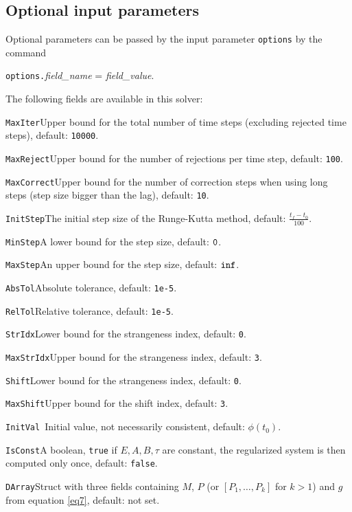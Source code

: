\documentclass[final,reqno]{siamltex}
\renewenvironment{itemize}[1]{\begin{compactitem}#1}{\end{compactitem}}
\begin{document}
\subsection{Optional input parameters}
Optional parameters can be passed by the input parameter {\tt options} by the command
\begin{center}
{\tt options.}{\it field\_name} = {\it field\_value}.
\end{center}
The following fields are available in this solver:
\begin{itemize}
\item {\tt MaxIter}\quad        Upper bound for the total number of time steps (excluding
	rejected time steps), default: {\tt 10000}.
\item {\tt MaxReject}\quad      Upper bound for the number of rejections per time step, default: {\tt 100}.
\item{\tt MaxCorrect}\quad  Upper bound for the number of correction steps when using
         long steps (step size bigger than the lag), default: {\tt10}.
\item {\tt InitStep}\quad        The initial step size of the Runge-Kutta method, default: $\frac{t_f-t_0}{100}$.
\item {\tt MinStep}\quad         A lower bound for the step size, default: $\tt 0$.
\item {\tt MaxStep}\quad      An upper bound for the step size, default: $\tt inf$.
\item {\tt AbsTol}\quad       Absolute tolerance, default:  {\tt 1e-5}.
\item {\tt RelTol}\quad       Relative tolerance, default:  {\tt 1e-5}.
\item {\tt StrIdx}\quad       Lower bound for the strangeness index,  default: {\tt 0}.
\item {\tt MaxStrIdx}\quad    Upper bound for the strangeness index,  default: {\tt 3}.
\item {\tt Shift}\quad       Lower bound for the strangeness index,  default: {\tt 0}.
\item {\tt MaxShift}\quad    Upper bound for the shift index,  default: {\tt 3}.
\item {\tt InitVal  }\quad    Initial value, not necessarily consistent,  default: $\phi(t_0)$.
\item {\tt IsConst}\quad   A boolean, {\tt true} if $E,A,B,\tau$ are constant, the regularized system is then computed only once, default: {\tt false}.
\item {\tt DArray}\quad    Struct with three fields containing $M$, $P$ (or $[P_1,\ldots,P_k]$ for $k>1$) and $g$ from equation \eqref{eq7}, default: not set.
\end{itemize}
\end{document}
